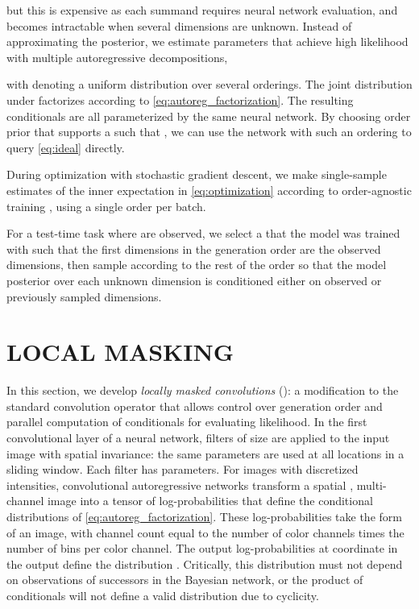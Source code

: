\documentclass[letterpaper]{article}
\begin{document}
but this is expensive as each summand requires neural network evaluation, and becomes intractable when several dimensions are unknown. 
Instead of approximating the posterior, we estimate parameters  that achieve high likelihood with multiple autoregressive decompositions,

with  denoting a uniform distribution over several orderings. The joint distribution under  factorizes according to \eqref{eq:autoreg_factorization}. The resulting conditionals are all parameterized by the same neural network. By choosing order prior  that supports a  such that , we can use the network with such an ordering to query \eqref{eq:ideal} directly.

During optimization with stochastic gradient descent, we make single-sample estimates of the inner expectation in \eqref{eq:optimization} according to order-agnostic training \citep{uria2014deep, germain2015made}, using a single order per batch.

For a test-time task where  are observed, we select a  that the model was trained with such that  \ie{} the first  dimensions in the generation order are the observed dimensions, then sample according to the rest of the order so that the model posterior over each unknown dimension is conditioned either on observed or previously sampled dimensions.

\section{LOCAL MASKING}

In this section, we develop \textit{locally masked convolutions} (\ours{}): a modification to the standard convolution operator that allows control over generation order and parallel computation of conditionals for evaluating likelihood.
In the first convolutional layer of a neural network,  filters of size  are applied to the input image with spatial invariance: the same parameters are used at all locations in a sliding window. Each filter has  parameters. For images with discretized intensities, convolutional autoregressive networks transform a spatial , multi-channel image into a tensor of log-probabilities that define the conditional distributions of \eqref{eq:autoreg_factorization}. These log-probabilities take the form of an  image, with channel count equal to the number of color channels times the number of bins per color channel. The output log-probabilities at coordinate  in the output define the distribution . Critically, this distribution must not depend on observations of successors in the Bayesian network, or the product of conditionals will not define a valid distribution due to cyclicity.
\end{document}
